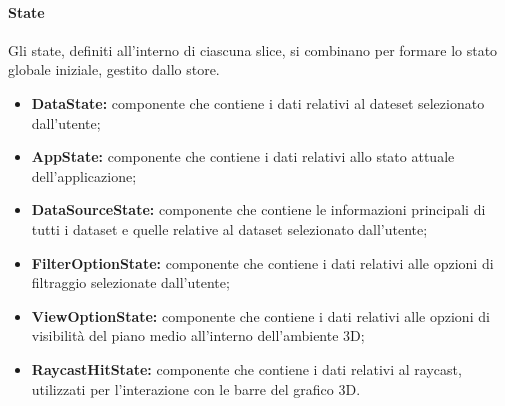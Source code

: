 \paragraph{State}
    Gli state, definiti all'interno di ciascuna slice, si combinano per formare lo stato globale iniziale, gestito dallo store.
    \begin{itemize}
        \item \textbf{DataState:} componente che contiene i dati relativi al dateset selezionato dall'utente;
        \item \textbf{AppState:} componente che contiene i dati relativi allo stato attuale dell'applicazione;
        \item \textbf{DataSourceState:} componente che contiene le informazioni principali di tutti i dataset e quelle relative al dataset selezionato dall'utente;
        \item \textbf{FilterOptionState:} componente che contiene i dati relativi alle opzioni di filtraggio selezionate dall'utente;
        \item \textbf{ViewOptionState:} componente che contiene i dati relativi alle opzioni di visibilità del piano medio all'interno dell'ambiente 3D;
        \item \textbf{RaycastHitState:} componente che contiene i dati relativi al raycast, utilizzati per l'interazione con le barre del grafico 3D.
    \end{itemize}
